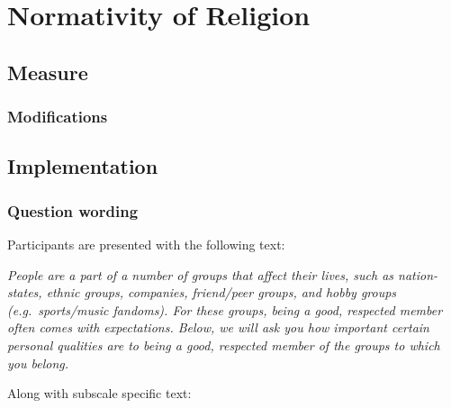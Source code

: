 \documentclass[
  letterpaper,
]{scrbook}
\begin{document}
\chapter{Normativity of Religion}\label{normativity-of-religion}

\section{Measure}\label{measure-2}

\subsection*{Modifications}\label{modifications-2}

\section{Implementation}\label{implementation-2}

\subsection*{Question wording}\label{question-wording-2}

Participants are presented with the following text:

\emph{People are a part of a number of groups that affect their lives,
such as nation-states, ethnic groups, companies, friend/peer groups, and
hobby groups (e.g.~sports/music fandoms). For these groups, being a
good, respected member often comes with expectations. Below, we will ask
you how important certain personal qualities are to being a good,
respected member of the groups to which you belong.}

Along with subscale specific text:
\end{document}
